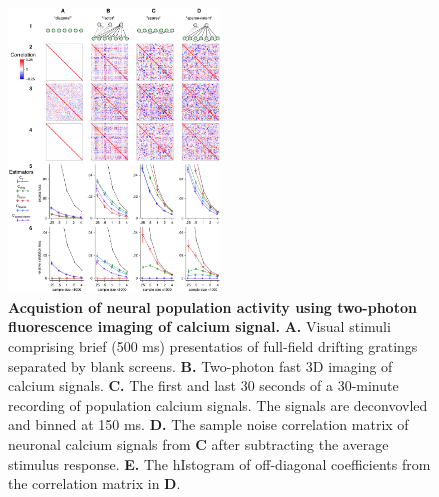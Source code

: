 \begin{figure}[htp]
\begin{center}
\includegraphics[width=0.5\textwidth]{figures/Figure1.pdf}
\end{center}
\caption{
{\bf Acquistion of neural population activity using two-photon fluorescence imaging of calcium signal.}  {\bf A.} Visual stimuli comprising brief (500 ms) presentatios of full-field drifting gratings separated by blank screens. {\bf B.} Two-photon fast 3D imaging of calcium signals. {\bf C.} The first and last 30 seconds of a 30-minute recording of population calcium signals. The signals are deconvovled and binned at 150 ms. {\bf D.} The sample noise correlation matrix of neuronal calcium signals from {\bf C} after subtracting the average stimulus response. {\bf E.} The hIstogram of off-diagonal coefficients from the correlation matrix in {\bf D}.
}
\label{fig:01}
\end{figure}
